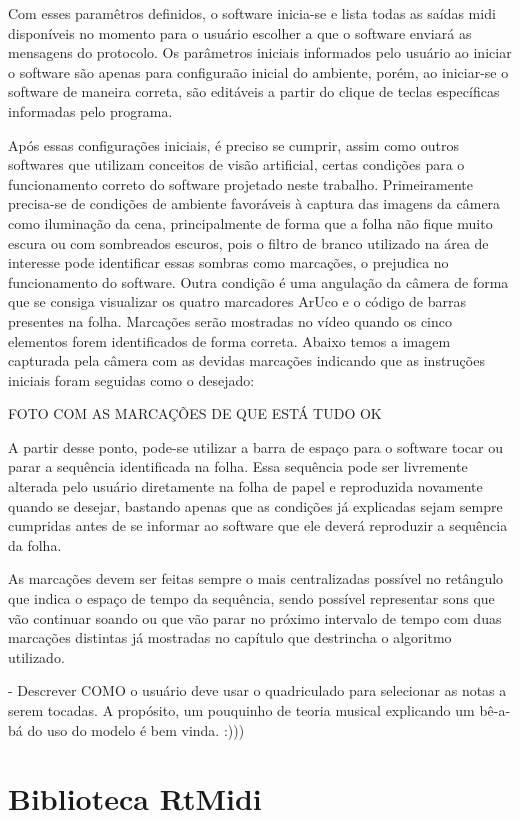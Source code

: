 \documentclass[12pt]{report}
\begin{document}
Com esses paramêtros definidos, o software inicia-se e lista todas as saídas midi disponíveis no momento para o usuário escolher a que o software enviará as mensagens do protocolo. Os parâmetros iniciais informados pelo usuário ao iniciar o software são apenas para configuraão inicial do ambiente, porém, ao iniciar-se o software de maneira correta, são editáveis a partir do clique de teclas específicas informadas pelo programa.

Após essas configurações iniciais, é preciso se cumprir, assim como outros softwares que utilizam conceitos de visão artificial, certas condições para o funcionamento correto do software projetado neste trabalho.
Primeiramente precisa-se de condições de ambiente favoráveis à captura das imagens da câmera como iluminação da cena, principalmente de forma que a folha não fique muito escura ou com sombreados escuros, pois o filtro de branco utilizado na área de interesse pode identificar essas sombras como marcações, o prejudica no funcionamento do software. Outra condição é uma angulação da câmera de forma que se consiga visualizar os quatro marcadores ArUco e o código de barras presentes na folha. Marcações serão mostradas no vídeo quando os cinco elementos forem identificados de forma correta. Abaixo temos a imagem capturada pela câmera com as devidas marcações indicando que as instruções iniciais foram seguidas como o desejado:

FOTO COM AS MARCAÇÕES DE QUE ESTÁ TUDO OK

A partir desse ponto, pode-se utilizar a barra de espaço para o software tocar ou parar a sequência identificada na folha. Essa sequência pode ser livremente alterada pelo usuário diretamente na folha de papel e reproduzida novamente quando se desejar, bastando apenas que as condições já explicadas sejam sempre cumpridas antes de se informar ao software que ele deverá reproduzir a sequência da folha.

As marcações devem ser feitas sempre o mais centralizadas possível no retângulo que indica o espaço de tempo da sequência, sendo possível representar sons que vão continuar soando ou que vão parar no próximo intervalo de tempo com duas marcações distintas já mostradas no capítulo que destrincha o algoritmo utilizado.

- Descrever COMO o usuário deve usar o quadriculado para selecionar as
notas a serem tocadas. A propósito, um pouquinho de teoria musical
explicando um bê-a-bá do uso do modelo é bem vinda. :)))

\chapter{Biblioteca RtMidi}
\end{document}
